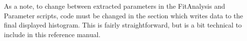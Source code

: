 \documentclass[twoside,letterpaper]{refart}
\begin{document}

As a note, to change between extracted parameters in the FitAnalysis and Parameter scripts, code must be changed in the section which writes data to the final displayed histogram. This is fairly straightforward, but is a bit technical to include in this reference manual.




	


\end{document}
